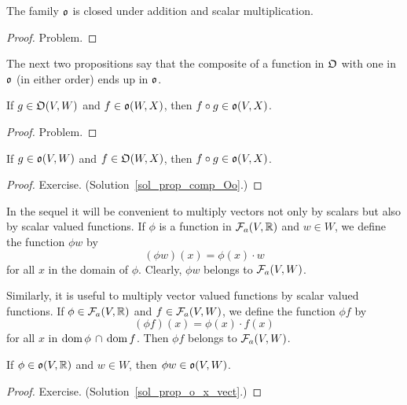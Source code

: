 \begin{prop}\label{prop_o_cl_add}  The family $\mathfrak{o}$ is closed under addition and scalar
multiplication.
\end{prop}

\begin{proof} Problem.  \ns  \end{proof}

The next two propositions say that the composite of a function in $\mathfrak{O}$ with one in $\mathfrak{o}$ (in either order) ends up in $\mathfrak{o}$.

\begin{prop} If $g \in \mathfrak{O}(V,W)$ and $f \in \mathfrak{o}(W,X)$, then $f \circ g \in \mathfrak{o}(V,X)$.
\end{prop}

\begin{proof} Problem.  \ns   \end{proof}

\begin{prop}\label{prop_comp_Oo} If $g \in \mathfrak{o}(V,W)$ and $f \in \mathfrak{O}(W,X)$, then
$f \circ g \in \mathfrak{o}(V,X)$.
\end{prop}

\begin{proof} Exercise. (Solution~\ref{sol_prop_comp_Oo}.)
  \ns   \end{proof}

\begin{notn}\label{notn_fcns_mult}  In the sequel it will be convenient to multiply vectors
not only by scalars but also by scalar valued functions.  If $\phi$ is a function in $\mathcal{F}_a(V,\mathbb{R})$ and $w \in W$, we define the function $\phi w$ by
  \[ (\phi w)(x) = \phi (x) \cdot w \]
for all $x$ in the domain of $\phi$.  Clearly, $\phi w$ belongs to $\mathcal{F}_a(V,W)$.

Similarly, it is useful to multiply vector valued functions by scalar valued functions.  If
$\phi \in \mathcal{F}_a(V,\mathbb{R})$ and $f \in \mathcal{F}_a(V,W)$, we define the function $\phi f$ by
  \[ (\phi f)(x) = \phi (x) \cdot f(x) \]
for all $x$ in $\operatorname{dom} \phi\, \cap\, \operatorname{dom} f$. Then $\phi f$ belongs to $\mathcal{F}_a(V,W)$.
\end{notn}

\begin{prop}\label{prop_o_x_vect}  If $\phi \in \mathfrak{o}(V,\mathbb{R})$ and $w \in W$, then
$\phi w \in \mathfrak{o}(V,W)$.
\end{prop}

\begin{proof} Exercise. (Solution~\ref{sol_prop_o_x_vect}.)  \ns   \end{proof}

